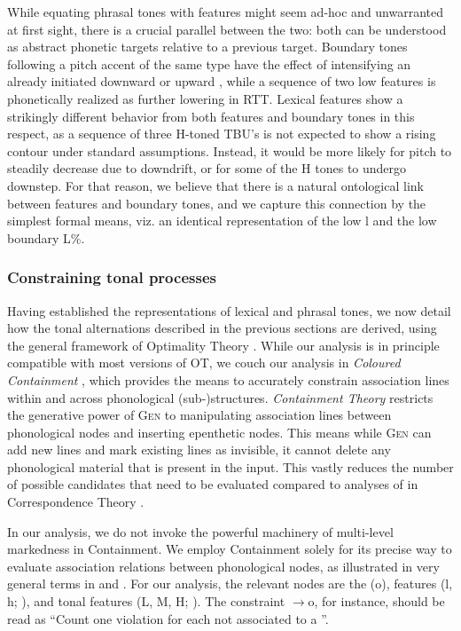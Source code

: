 \documentclass[output=paper,newtxmath,modfonts,nonflat,hidelinks]{langsci/langscibook}
\begin{document}
\largerpage[1.5]
\noindent While equating phrasal tones with  features might seem ad-hoc and unwarranted at first sight, there is a crucial parallel between the two: both can be understood as abstract phonetic targets relative to a previous target.
Boundary tones following a pitch accent of the same type have the effect of intensifying an already initiated downward or upward  \citep{Pierrehumbert.1980}, while a sequence of two low  features is phonetically realized as further lowering in RTT.
Lexical  features show a strikingly different behavior from both  features and boundary tones in this respect, as a sequence of three H-toned TBU's is not expected to show a rising contour under standard assumptions.
Instead, it would be more likely for pitch to steadily decrease due to downdrift, or for some of the H tones to undergo downstep.
For that reason, we believe that there is a natural ontological link between  features and boundary tones, and we capture this connection by the simplest formal means, viz. an identical representation of the low  l and the low boundary  L\%.

\subsubsection{Constraining tonal processes}

Having established the representations of lexical and phrasal tones, we now detail how the tonal alternations described in the previous sections are derived, using the general framework of Optimality Theory \citep{Prince.1993}.
While our analysis is in principle compatible with most versions of OT, we couch our analysis in \textit{Coloured Containment} \citep{Trommer.2015.Dinka,Zimmermann.2017.OUP}, which provides the means to accurately constrain association lines within and across phonological (sub-)structures.
\textit{Containment Theory} \citep{Oostendorp.2004} restricts the generative power of \textsc{Gen} to manipulating association lines between phonological nodes and inserting epenthetic nodes.
This means while \textsc{Gen} can add new lines and mark existing lines as invisible, it cannot delete any phonological material that is present in the input.
This vastly reduces the number of possible candidates that need to be evaluated compared to analyses of  in Correspondence Theory \citep{Zoll.2003,Zhang.2007}.

In our analysis, we do not invoke the powerful machinery of multi-level markedness in Containment. 
We employ Containment solely for its precise way to evaluate association relations between phonological nodes, as illustrated in very general terms in  and .
For our analysis, the relevant nodes are the  (o),  features (l, h; \textrho), and tonal features (L, M, H; \texttau).
The constraint \textrho$\to$o, for instance, should be read as ``Count one violation for each  not associated to a ''.
\end{document}
